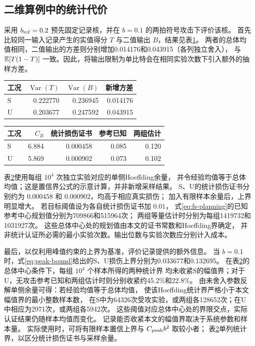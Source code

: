 \subsection{二维算例中的统计代价}
采用 $b_{\rm ref}=0.2$ 预先固定记录核，并在 $b=0.1$ 的两拍符号攻击下评价该核。
首先比较同一输入记录产生的实值得分 $T$ 与二值输出 $B$，结果见表\ref{tab:vector-variance}。
两者的总体均值相同，二值输出的方差则分别增加0.014176和0.043915（各列独立舍入），
与 $\mathbb E[T(1-T)]$ 一致。因此，将输出限制为单比特会在相同实验次数下引入额外的抽样方差。

\begin{table}[H]
\centering\small
{}
\label{tab:vector-variance}
\begin{tabular}{lrrr}
\toprule
工况 & $\operatorname{Var}(T)$ & $\operatorname{Var}(B)$ & 新增方差\\
\midrule
S & 0.222770 & 0.236945 & 0.014176 \\
U & 0.203677 & 0.247592 & 0.043915 \\
\bottomrule
\end{tabular}
\end{table}

\begin{table}[H]
\centering\small
{}
\label{tab:vector-confidence}
\begin{tabular}{lrrrr}
\toprule
工况 & $C_B$ & 统计损伤证书 & 参考已知 & 两组估计\\
\midrule
S & 6.884 & 0.000458 & 0.085 & 0.120 \\
U & 5.869 & 0.000902 & 0.073 & 0.102 \\
\bottomrule
\end{tabular}
\end{table}
表\ref{tab:vector-confidence}使用每组 $10^4$ 次独立实验对应的单侧Hoeffding余量，
并令经验均值等于总体均值；这是置信界公式的示意计算，并非新增采样结果。
S、U的统计损伤证书分别约为 $0.000458$ 和 $0.000902$，均高于相应真实损伤；
加入有限样本余量后，上界明显增大。
若目标阈值设为各自统计损伤证书加 $0.01$，
式\eqref{eq:fs-planning}的已知参考中心规划值分别为709866和515964次；
两组等量估计时分别为每组1419732和1031927次。
这些总体中心处的规划值由本文的证书常数和Hoeffding界确定，
并非统计认证所必需的最小实验次数。输出位数与实验次数应分别计入成本。

最后，以仅利用峰值约束的上界为基准，评价记录提供的额外信息。
当 $b=0.1$ 时，式\eqref{eq:peak-bound}给出的S、U损伤上界分别为0.033677和0.132695。
在表\ref{tab:vector-confidence}的总体中心条件下，每组 $10^4$ 个样本所得的两种统计界
均未收紧S的幅值界；对于U，无攻击参考已知和两组估计时则分别收紧约45.2\%和22.8\%。
由未舍入参数反解单侧余量可得：若经验均值等于总体均值，
使该Hoeffding统计界严格小于本文幅值界的最小整数样本数，
在S中为64326次受攻实验，或两组各128652次；在U中相应为2971次，或两组各5942次。
这些阈值对应总体中心处的界限交点，实际认证结果仍随样本均值而变化。
记录能否收紧本文的幅值界取决于系统参数和样本量。
实际使用时，可将有限样本置信上界与 $C_{\rm peak}b^2$ 取较小者；
表\ref{tab:vector-confidence}单列统计界，以区分统计损伤证书与采样余量。
